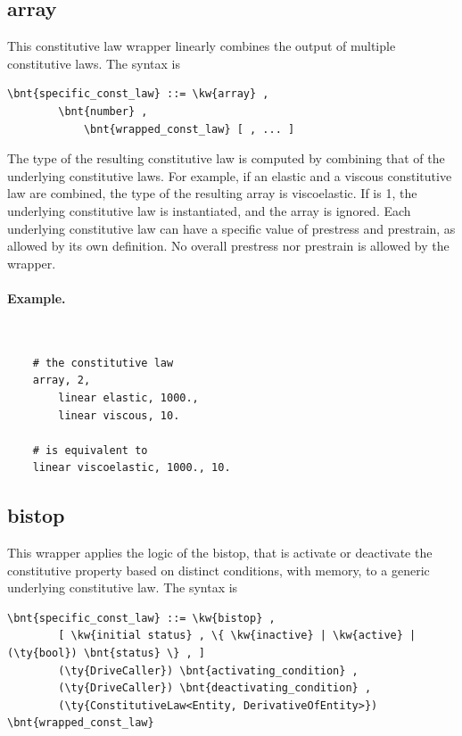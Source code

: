 \subsection{array}
This constitutive law wrapper linearly combines the output
of multiple constitutive laws.
The syntax is
\begin{Verbatim}[commandchars=\\\{\}]
    \bnt{specific_const_law} ::= \kw{array} ,
        \bnt{number} ,
            \bnt{wrapped_const_law} [ , ... ]
\end{Verbatim}
The type of the resulting constitutive law is computed by combining
that of the underlying constitutive laws.
For example, if an elastic and a viscous constitutive law are combined,
the type of the resulting array is viscoelastic.
If  is 1, the underlying constitutive law is instantiated,
and the array is ignored.
Each underlying constitutive law can have a specific value
of prestress and prestrain, as allowed by its own definition.
No overall prestress nor prestrain is allowed by the  wrapper.

\paragraph{Example.} \
\begin{verbatim}
    # the constitutive law
    array, 2,
        linear elastic, 1000.,
        linear viscous, 10.

    # is equivalent to
    linear viscoelastic, 1000., 10.
\end{verbatim}


\subsection{bistop}
This wrapper applies the logic of the bistop, that is activate or deactivate
the constitutive property based on distinct conditions, with memory,
to a generic underlying constitutive law.
The syntax is
\begin{Verbatim}[commandchars=\\\{\}]
    \bnt{specific_const_law} ::= \kw{bistop} ,
        [ \kw{initial status} , \{ \kw{inactive} | \kw{active} | (\ty{bool}) \bnt{status} \} , ]
        (\ty{DriveCaller}) \bnt{activating_condition} ,
        (\ty{DriveCaller}) \bnt{deactivating_condition} ,
        (\ty{ConstitutiveLaw<Entity, DerivativeOfEntity>}) \bnt{wrapped_const_law}
\end{Verbatim}


